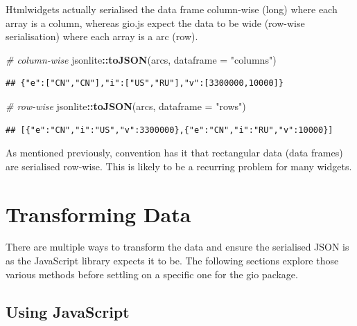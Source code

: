 \documentclass[
]{krantz}
\makeatletter
\newenvironment{Shaded}{\begin{snugshade}}{\end{snugshade}}
\newcommand{\CommentTok}[1]{\textcolor[rgb]{0.37,0.37,0.37}{\textit{#1}}}
\newcommand{\DataTypeTok}[1]{\textcolor[rgb]{0.27,0.27,0.27}{#1}}
\newcommand{\KeywordTok}[1]{\textcolor[rgb]{0.27,0.27,0.27}{\textbf{#1}}}
\newcommand{\NormalTok}[1]{#1}
\newcommand{\OperatorTok}[1]{\textcolor[rgb]{0.43,0.43,0.43}{\textbf{#1}}}
\newcommand{\StringTok}[1]{\textcolor[rgb]{0.5,0.5,0.5}{#1}}
\newenvironment{kframe}{%
\medskip{}
\setlength{\fboxsep}{.8em}
 \def\at@end@of@kframe{}%
 \ifinner\ifhmode%
  \def\at@end@of@kframe{\end{minipage}}%
  \begin{minipage}{\columnwidth}%
 \fi\fi%
 \def\FrameCommand##1{\hskip\@totalleftmargin \hskip-\fboxsep
 \colorbox{shadecolor}{##1}\hskip-\fboxsep
     \hskip-\linewidth \hskip-\@totalleftmargin \hskip\columnwidth}%
 \MakeFramed {\advance\hsize-\width
   \@totalleftmargin\z@ \linewidth\hsize
   \@setminipage}}%
 {\par\unskip\endMakeFramed%
 \at@end@of@kframe}
\renewenvironment{Shaded}{\begin{kframe}}{\end{kframe}}
\makeatother
\begin{document}
Htmlwidgets actually serialised the data frame column-wise (long) where each array is a column, whereas gio.js expect the data to be wide (row-wise serialisation) where each array is a arc (row).

\begin{Shaded}
\begin{Highlighting}[]
\CommentTok{\# column{-}wise}
\NormalTok{jsonlite}\OperatorTok{::}\KeywordTok{toJSON}\NormalTok{(arcs, }\DataTypeTok{dataframe =} \StringTok{"columns"}\NormalTok{)}
\end{Highlighting}
\end{Shaded}

\begin{verbatim}
## {"e":["CN","CN"],"i":["US","RU"],"v":[3300000,10000]}
\end{verbatim}

\begin{Shaded}
\begin{Highlighting}[]
\CommentTok{\# row{-}wise}
\NormalTok{jsonlite}\OperatorTok{::}\KeywordTok{toJSON}\NormalTok{(arcs, }\DataTypeTok{dataframe =} \StringTok{"rows"}\NormalTok{)}
\end{Highlighting}
\end{Shaded}

\begin{verbatim}
## [{"e":"CN","i":"US","v":3300000},{"e":"CN","i":"RU","v":10000}]
\end{verbatim}

As mentioned previously, convention has it that rectangular data (data frames) are serialised row-wise. This is likely to be a recurring problem for many widgets.

\hypertarget{widgets-full-transform-data}{%
\section{Transforming Data}\label{widgets-full-transform-data}}

There are multiple ways to transform the data and ensure the serialised JSON is as the JavaScript library expects it to be. The following sections explore those various methods before settling on a specific one for the gio package.

\hypertarget{widgets-full-transform-data-js}{%
\subsection{Using JavaScript}\label{widgets-full-transform-data-js}}
\end{document}
